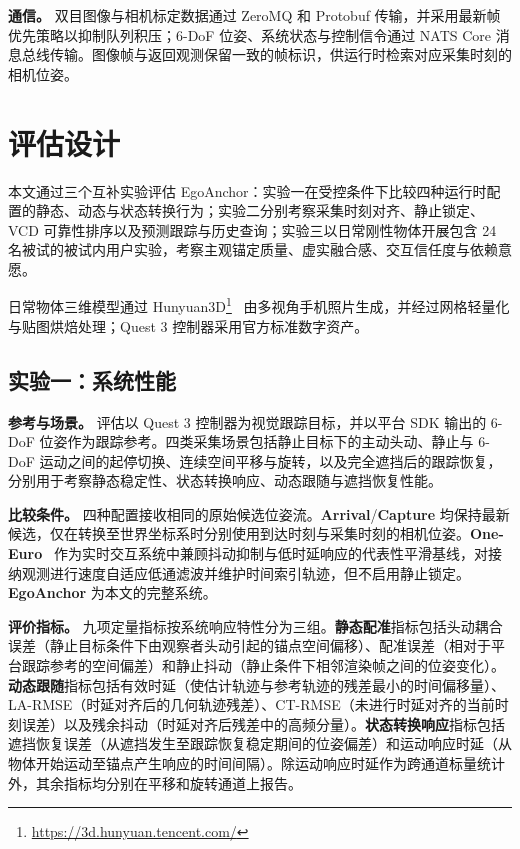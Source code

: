 \documentclass[review]{vgtc}
\begin{document}
\textbf{通信。}
双目图像与相机标定数据通过 ZeroMQ 和 Protobuf 传输，并采用最新帧优先策略以抑制队列积压；6-DoF 位姿、系统状态与控制信令通过 NATS Core 消息总线传输。图像帧与返回观测保留一致的帧标识，供运行时检索对应采集时刻的相机位姿。

\section{评估设计}\label{sec:evaluation}

本文通过三个互补实验评估 EgoAnchor：实验一在受控条件下比较四种运行时配置的静态、动态与状态转换行为；实验二分别考察采集时刻对齐、静止锁定、VCD 可靠性排序以及预测跟踪与历史查询；实验三以日常刚性物体开展包含 24 名被试的被试内用户实验，考察主观锚定质量、虚实融合感、交互信任度与依赖意愿。

日常物体三维模型通过 Hunyuan3D\footnote{\url{https://3d.hunyuan.tencent.com/}}~\cite{hunyuan3d22025tencent} 由多视角手机照片生成，并经过网格轻量化与贴图烘焙处理；Quest 3 控制器采用官方标准数字资产。

\subsection{实验一：系统性能}\label{sec:exp1-design}

\textbf{参考与场景。}
评估以 Quest 3 控制器为视觉跟踪目标，并以平台 SDK 输出的 6-DoF 位姿作为跟踪参考。四类采集场景包括静止目标下的主动头动、静止与 6-DoF 运动之间的起停切换、连续空间平移与旋转，以及完全遮挡后的跟踪恢复，分别用于考察静态稳定性、状态转换响应、动态跟随与遮挡恢复性能。

\textbf{比较条件。}
四种配置接收相同的原始候选位姿流。\textbf{Arrival}/\textbf{Capture} 均保持最新候选，仅在转换至世界坐标系时分别使用到达时刻与采集时刻的相机位姿。\textbf{One-Euro}~\cite{casiez2012oneeuro} 作为实时交互系统中兼顾抖动抑制与低时延响应的代表性平滑基线，对接纳观测进行速度自适应低通滤波并维护时间索引轨迹，但不启用静止锁定。\textbf{EgoAnchor} 为本文的完整系统。

\textbf{评价指标。}
九项定量指标按系统响应特性分为三组。\textbf{静态配准}指标包括头动耦合误差（静止目标条件下由观察者头动引起的锚点空间偏移）、配准误差（相对于平台跟踪参考的空间偏差）和静止抖动（静止条件下相邻渲染帧之间的位姿变化）。\textbf{动态跟随}指标包括有效时延（使估计轨迹与参考轨迹的残差最小的时间偏移量）、LA-RMSE（时延对齐后的几何轨迹残差）、CT-RMSE（未进行时延对齐的当前时刻误差）以及残余抖动（时延对齐后残差中的高频分量）。\textbf{状态转换响应}指标包括遮挡恢复误差（从遮挡发生至跟踪恢复稳定期间的位姿偏差）和运动响应时延（从物体开始运动至锚点产生响应的时间间隔）。除运动响应时延作为跨通道标量统计外，其余指标均分别在平移和旋转通道上报告。
\end{document}
